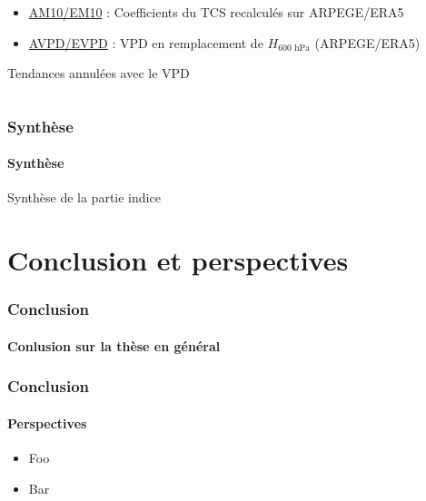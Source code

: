 \documentclass[aspectratio=169, usepdftitle=false, xcolor={dvipsnames}, 9pt,table]{beamer}
\begin{document}
\begin{frame}[t]
\begin{columns}
\begin{column}{0.3\textwidth}
\begin{examples}[Indices]
\begin{itemize}
                    \item \underline{AM10/EM10} : Coefficients du TCS recalculés sur ARPEGE/ERA5
                    \item \underline{AVPD/EVPD} : VPD en remplacement de $H_\text{600~hPa}$ (ARPEGE/ERA5) 
                \end{itemize}
            \end{examples}
            \vspace{1em}
            \begin{alertblock}
                \centering
                Tendances annulées avec le VPD
            \end{alertblock}
        \end{column}
    \end{columns}
\end{frame}

\begin{frame}[c]
    \frametitle{Synthèse}
    \framesubtitle{Synthèse}
        Synthèse de la partie indice 
\end{frame}

\section{Conclusion et perspectives}
\begin{frame}[c]
    \frametitle{Conclusion}
    \framesubtitle{Conlusion sur la thèse en général}

\end{frame}

\begin{frame}[t]
    \frametitle{Conclusion}
    \framesubtitle{Perspectives}
    \begin{itemize}
        \item Foo
        \item Bar
    \end{itemize} 
\end{frame}


%
\end{document}
